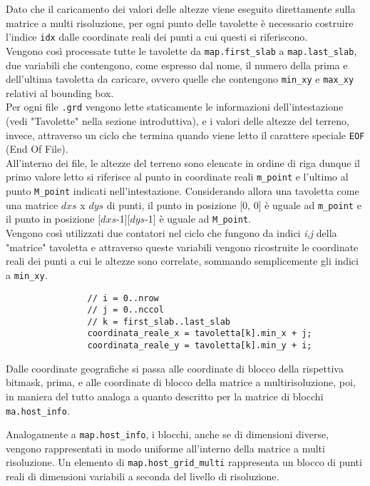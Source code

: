 			Dato che il caricamento dei valori delle altezze viene eseguito direttamente sulla matrice a multi risoluzione, per ogni punto delle tavolette \`{e} necessario costruire l'indice \texttt{idx} dalle coordinate reali dei punti a cui questi si riferiscono.\\
			Vengono cos\`{i} processate tutte le tavolette da \texttt{map.first\_slab} a \texttt{map.last\_slab}, due variabili che contengono, come espresso dal nome, il numero della prima e dell'ultima tavoletta da caricare, ovvero quelle che contengono \texttt{min\_xy} e \texttt{max\_xy} relativi al bounding box.\\
			Per ogni file \texttt{.grd} vengono lette staticamente le informazioni dell'intestazione (vedi "Tavolette" nella sezione introduttiva), e i valori delle altezze del terreno, invece, attraverso un ciclo che termina quando viene letto il carattere speciale \texttt{EOF} (End Of File). \\
			All'interno dei file, le altezze del terreno sono elencate in ordine di riga dunque il primo valore letto si riferisce al punto in coordinate reali \texttt{m\_point} e l'ultimo al punto \texttt{M\_point} indicati nell'intestazione. Considerando allora una tavoletta come una matrice $dxs$ x $dys$ di punti, il punto in posizione [0, 0] \`{e} uguale ad \texttt{m\_point} e il punto in posizione [$dxs$-1][$dys$-1] \`{e} uguale ad \texttt{M\_point}. \\
			Vengono cos\`{i} utilizzati due contatori nel ciclo che fungono da indici \textit{i,j} della "matrice" tavoletta e attraverso queste variabili vengono ricostruite le coordinate reali dei punti a cui le altezze sono correlate, sommando semplicemente gli indici a \texttt{min\_xy}.
			\begin{verbatim}
				// i = 0..nrow
				// j = 0..nccol
				// k = first_slab..last_slab
				coordinata_reale_x = tavoletta[k].min_x + j; 
				coordinata_reale_y = tavoletta[k].min_y + i; 
			\end{verbatim}
			Dalle coordinate geografiche si passa alle coordinate di blocco della rispettiva bitmask, prima, e alle coordinate di blocco della matrice a multirisoluzione, poi, in maniera del tutto analoga a quanto descritto per la matrice di blocchi \texttt{ma.host\_info}.

			Analogamente a \texttt{map.host\_info}, i blocchi, anche se di dimensioni diverse, vengono rappresentati in modo uniforme all'interno della matrice a multi risoluzione. Un elemento di \texttt{map.host\_grid\_multi} rappresenta un blocco di punti reali di dimensioni variabili a seconda del livello di risoluzione. 

